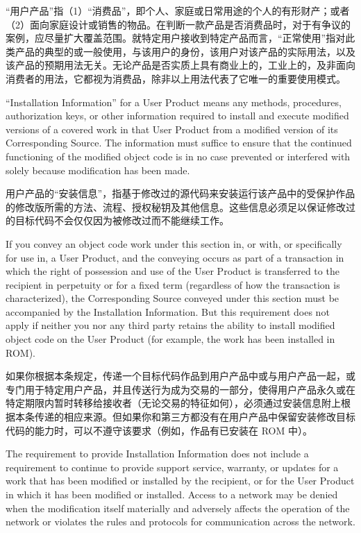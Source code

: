 \documentclass[11pt]{article}
\begin{document}
\begin{enumerate}
“用户产品”指（1）“消费品”，即个人、家庭或日常用途的个人的有形财产；或者（2）面向家庭设计或销售的物品。在判断一款产品是否消费品时，对于有争议的案例，应尽量扩大覆盖范围。就特定用户接收到特定产品而言，“正常使用”指对此类产品的典型的或一般使用，与该用户的身份，该用户对该产品的实际用法，以及该产品的预期用法无关。无论产品是否实质上具有商业上的，工业上的，及非面向消费者的用法，它都视为消费品，除非以上用法代表了它唯一的重要使用模式。

``Installation Information'' for a User Product means any methods,
procedures, authorization keys, or other information required to install
and execute modified versions of a covered work in that User Product from
a modified version of its Corresponding Source.  The information must
suffice to ensure that the continued functioning of the modified object
code is in no case prevented or interfered with solely because
modification has been made.

用户产品的“安装信息”，指基于修改过的源代码来安装运行该产品中的受保护作品的修改版所需的方法、流程、授权秘钥及其他信息。这些信息必须足以保证修改过的目标代码不会仅仅因为被修改过而不能继续工作。

If you convey an object code work under this section in, or with, or
specifically for use in, a User Product, and the conveying occurs as
part of a transaction in which the right of possession and use of the
User Product is transferred to the recipient in perpetuity or for a
fixed term (regardless of how the transaction is characterized), the
Corresponding Source conveyed under this section must be accompanied
by the Installation Information.  But this requirement does not apply
if neither you nor any third party retains the ability to install
modified object code on the User Product (for example, the work has
been installed in ROM).

如果你根据本条规定，传递一个目标代码作品到用户产品中或与用户产品一起，或专门用于特定用户产品，并且传送行为成为交易的一部分，使得用户产品永久或在特定期限内暂时转移给接收者（无论交易的特征如何），必须通过安装信息附上根据本条传递的相应来源。但如果你和第三方都没有在用户产品中保留安装修改目标代码的能力时，可以不遵守该要求（例如，作品有已安装在 ROM 中）。

The requirement to provide Installation Information does not include a
requirement to continue to provide support service, warranty, or updates
for a work that has been modified or installed by the recipient, or for
the User Product in which it has been modified or installed.  Access to a
network may be denied when the modification itself materially and
adversely affects the operation of the network or violates the rules and
protocols for communication across the network.


\end{enumerate}
\end{document}
